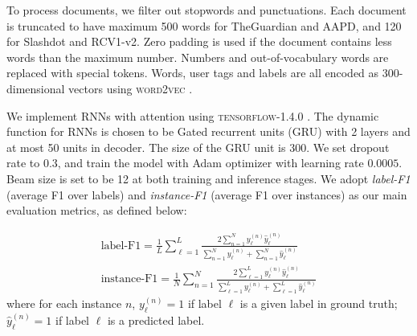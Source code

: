  To process documents, we filter out stopwords and punctuations. Each document is truncated to have maximum 500 words for TheGuardian and AAPD, and 120 for Slashdot and RCV1-v2. Zero padding is used if the document contains less words than the maximum number. Numbers and out-of-vocabulary words are replaced with special tokens. Words, user tags and labels are all encoded as 300-dimensional vectors using \textsc{word2vec} \cite{DBLP:journals/corr/abs-1301-3781}.
 
 We implement RNNs with attention using \textsc{tensorflow-1.4.0} \cite{DBLP:conf/osdi/AbadiBCCDDDGIIK16}. The dynamic function for RNNs is chosen to be Gated recurrent units (GRU) with 2 layers and at most 50 units in decoder. The size of the GRU unit is 300. We set dropout rate to 0.3, and train the model with Adam optimizer \cite{DBLP:journals/corr/KingmaB14} with learning rate $0.0005$. Beam size is set to be 12 at both training and inference stages. We adopt \emph{label-F1} (average F1 over labels) and \emph{instance-F1} (average F1 over instances) as our main evaluation metrics, as defined below:
 
\begin{align*} \text{label-F1} = \frac{1}{L}\sum_{\ell=1}^L\frac{2\sum_{n=1}^N y^{(n)}_\ell \hat{y}^{(n)}_\ell}{\sum_{n=1}^N y^{(n)}_\ell+\sum_{n=1}^N \hat{y}^{(n)}_\ell}\\
\text{instance-F1} = \frac{1}{N}\sum_{n=1}^N\frac{2\sum_{\ell=1}^L y^{(n)}_\ell \hat{y}^{(n)}_\ell}{\sum_{\ell=1}^L y^{(n)}_\ell+\sum_{\ell=1}^L \hat{y}^{(n)}_\ell}
\end{align*}
where for each instance $n$, $y_\ell^{(n)}=1$ if label $\ell$ is a given label in ground truth; $\hat{y}_\ell^{(n)}=1$ if label $\ell$ is a predicted label.

